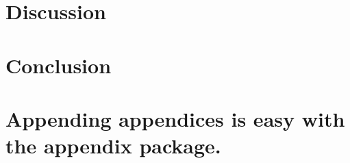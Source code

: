 \documentclass[aps,reprint]{revtex4-1}
\newcommand\blankpage{%
  \null
  \thispagestyle{empty}%
  \addtocounter{page}{-1}%
  \newpage}
\begin{document}
\section{Discussion}
\label{sec:discussion}

\section{Conclusion}
\label{sec:conclusion}


\blankpage
\appendix
\section{Appending appendices is easy with the appendix package.}
\blankpage
\end{document}
